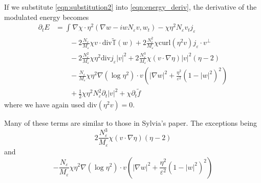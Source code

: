 \documentclass[a4paper]{article}
\newcommand{\curl}{\mathrm{curl}}
\renewcommand{\div}{\mathrm{div}}
\begin{document}
If we substitute \eqref{eqn:substitution2} into \eqref{eqn:energy_deriv}, the derivative of the modulated energy becomes
\begin{align}
  \partial_t E &= \int_{}^{} \nabla \chi \cdot \eta^2 ( \nabla w - i w N_\varepsilon v, w_t) - \chi \eta^2 N_\varepsilon v_t j_\varepsilon \nonumber
  \\
  &\quad \quad -2 \frac{N_\varepsilon}{M_\varepsilon} \chi v \cdot \div \tilde{\mathbb{T}}(w) + 2
  \frac{N_\varepsilon^2}{M_\varepsilon} \chi \curl(\eta^2 v) j_\varepsilon \cdot v^\perp \nonumber \\
  &\quad \quad - 2\frac{N_\varepsilon^2}{M_\varepsilon} \chi \eta^2 \div j_\varepsilon |v|^2 + 2 \frac{N_\varepsilon^3}{M_\varepsilon} \chi (v \cdot \nabla
  \eta) |v|^2 (\eta - 2) \nonumber \\
  &\quad \quad - \frac{N_\varepsilon}{M_\varepsilon}
  \chi \eta^2 \nabla( \log \eta^2 ) \cdot v \left( | \nabla w |^2 + \frac{\eta^2}{\varepsilon^2} (1-|w|^2)^2 \right) \nonumber \\
  &\quad \quad + \frac{1}{2} \chi \eta^2 N_\varepsilon^2 \partial_t |v|^2 + \chi \partial_t \tilde{f}
  \label{eqn:deriv_energy}
\end{align}
where we have again used $\div(\eta^2 v) = 0$.

Many of these terms are similar to those in Sylvia's paper. The exceptions being
\[ 2 \frac{N_\varepsilon^3}{M_\varepsilon} \chi ( v \cdot \nabla \eta) ( \eta - 2 ) \]
and
\[ - \frac{N_\varepsilon}{M_\varepsilon} \chi \eta^2 \nabla ( \log \eta^2 ) \cdot v \left( | \nabla w |^2 + \frac{\eta^2}{\varepsilon^2} ( 1-|w|^2)^2
\right) \]
\end{document}

